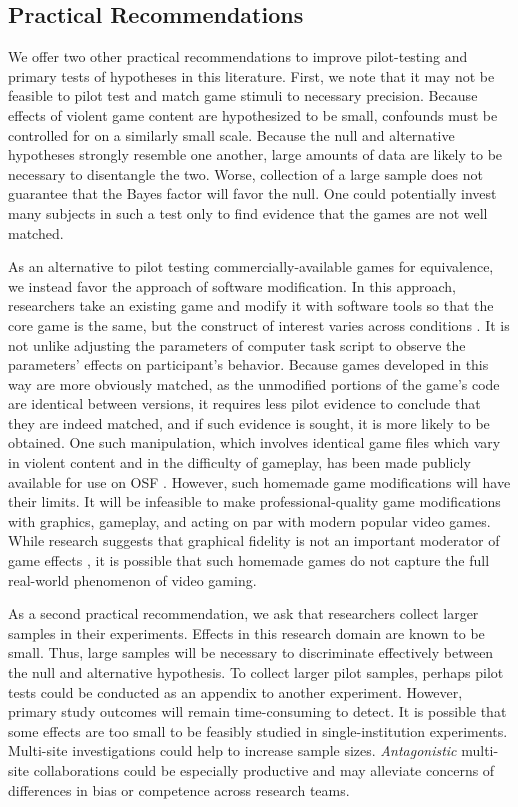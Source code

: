 \documentclass[man]{apa6}
\begin{document}
\subsection{Practical Recommendations}
We offer two other practical recommendations to improve pilot-testing and primary tests of hypotheses in this literature. First, we note that it may not be feasible to pilot test and match game stimuli to necessary precision. Because effects of violent game content are hypothesized to be small, confounds must be controlled for on a similarly small scale. Because the null and alternative hypotheses strongly resemble one another, large amounts of data are likely to be necessary to disentangle the two. Worse, collection of a large sample does not guarantee that the Bayes factor will favor the null. One could potentially invest many subjects in such a test only to find evidence that the games are not well matched. 

As an alternative to pilot testing commercially-available games for equivalence, we instead favor the approach of software modification. In this approach, researchers take an existing game and modify it with software tools so that the core game is the same, but the construct of interest varies across conditions \citep[see][]{Elson:Quandt:2014}. It is not unlike adjusting the parameters of computer task script to observe the parameters' effects on participant's behavior. Because games developed in this way are more obviously matched, as the unmodified portions of the game's code are identical between versions, it requires less pilot evidence to conclude that they are indeed matched, and if such evidence is sought, it is more likely to be obtained. One such manipulation, which involves identical game files which vary in violent content and in the difficulty of gameplay, has been made publicly available for use on OSF \citep{Hilgard:2014}. However, such homemade game modifications will have their limits. It will be infeasible to make professional-quality game modifications with graphics, gameplay, and acting on par with modern popular video games. While research suggests that graphical fidelity is not an important moderator of game effects \citep{Ivory:Kalyanaraman:2007}, it is possible that such homemade games do not capture the full real-world phenomenon of video gaming.

As a second practical recommendation, we ask that researchers collect larger samples in their experiments. Effects in this research domain are known to be small. Thus, large samples will be necessary to discriminate effectively between the null and alternative hypothesis. To collect larger pilot samples, perhaps pilot tests could be conducted as an appendix to another experiment. However, primary study outcomes will remain time-consuming to detect. It is possible that some effects are too small to be feasibly studied in single-institution experiments. Multi-site investigations could help to increase sample sizes. {\em Antagonistic} multi-site collaborations could be especially productive and may alleviate concerns of differences in bias or competence 
across research teams. %
\end{document}
